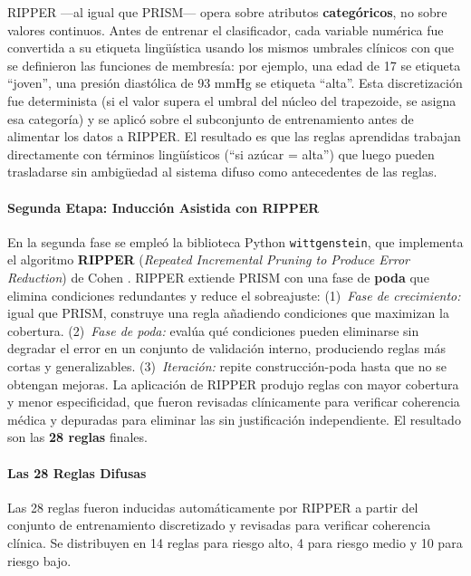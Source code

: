 \documentclass[11pt]{article}
\begin{document}
RIPPER ---al igual que PRISM--- opera sobre atributos \textbf{categ\'oricos}, no sobre valores continuos. Antes de entrenar el clasificador, cada variable num\'erica fue convertida a su etiqueta ling\"u\'istica usando los mismos umbrales cl\'inicos con que se definieron las funciones de membres\'ia: por ejemplo, una edad de 17 se etiqueta ``joven'', una presi\'on diast\'olica de 93 mmHg se etiqueta ``alta''. Esta discretizaci\'on fue determinista (si el valor supera el umbral del n\'ucleo del trapezoide, se asigna esa categor\'ia) y se aplic\'o sobre el subconjunto de entrenamiento antes de alimentar los datos a RIPPER. El resultado es que las reglas aprendidas trabajan directamente con t\'erminos ling\"u\'isticos (``si az\'ucar = alta'') que luego pueden trasladarse sin ambig\"uedad al sistema difuso como antecedentes de las reglas.

\paragraph{Segunda Etapa: Inducci\'on Asistida con RIPPER}

En la segunda fase se emple\'o la biblioteca Python \texttt{wittgenstein}, que implementa el algoritmo \textbf{RIPPER} (\textit{Repeated Incremental Pruning to Produce Error Reduction}) de Cohen \cite{cohen1995}. RIPPER extiende PRISM con una fase de \textbf{poda} que elimina condiciones redundantes y reduce el sobreajuste: (1)~\textit{Fase de crecimiento:} igual que PRISM, construye una regla a\~nadiendo condiciones que maximizan la cobertura. (2)~\textit{Fase de poda:} evalúa qu\'e condiciones pueden eliminarse sin degradar el error en un conjunto de validaci\'on interno, produciendo reglas m\'as cortas y generalizables. (3)~\textit{Iteraci\'on:} repite construcci\'on-poda hasta que no se obtengan mejoras. La aplicaci\'on de RIPPER produjo reglas con mayor cobertura y menor especificidad, que fueron revisadas cl\'inicamente para verificar coherencia m\'edica y depuradas para eliminar las sin justificaci\'on independiente. El resultado son las \textbf{28 reglas} finales.

\paragraph{Las 28 Reglas Difusas}

Las 28 reglas fueron inducidas autom\'aticamente por RIPPER a partir del conjunto de entrenamiento discretizado y revisadas para verificar coherencia cl\'inica. Se distribuyen en 14 reglas para riesgo alto, 4 para riesgo medio y 10 para riesgo bajo.
\end{document}
